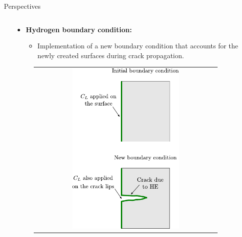 \documentclass[9pt]{beamer}
\begin{document}
\begin{frame}{Perspectives}
\begin{columns}
\begin{column}{0.5\textwidth}
    	\end{column}
    		

        \begin{column}{0.5\textwidth}
        
        \begin{itemize}
        	\item \textbf{Hydrogen boundary condition:}
        	\vspace{0.15cm}
        	\begin{itemize}
        		\item Implementation of a new boundary condition that accounts for the newly created surfaces during crack propagation.
        	\end{itemize}
        \end{itemize}
        \vspace{0.2cm}
        	\begin{figure}
        		\begin{tabular}{c}
            		\includegraphics[width=0.6\textwidth]{Images/new_BC_CL.pdf} \\
        		\end{tabular}
    		\end{figure}
        \end{column}

    \end{columns}
    
\end{frame}
\end{document}

